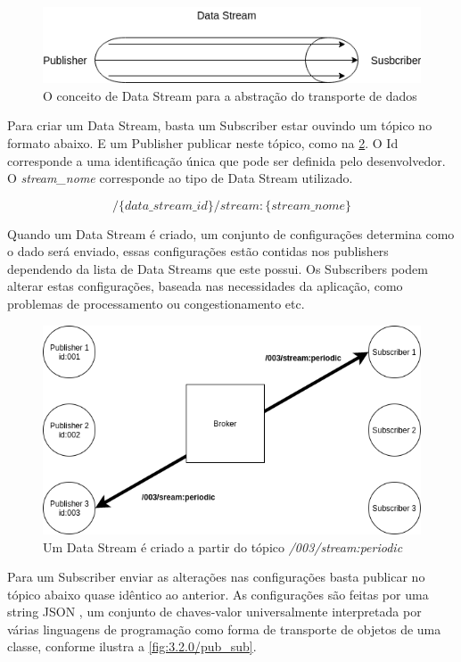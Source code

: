 \begin{figure}[h!]
\centering
\includegraphics[width=13cm]{./02_Capitulos/02_Cap3/figures/data_stream}
\caption{O conceito de Data Stream para a abstração do transporte de dados}
\label{fig:3.1.0/data_stream}
\end{figure}

Para criar um Data Stream, basta um Subscriber estar ouvindo um tópico no formato abaixo. E um Publisher publicar neste tópico, como na \ref{fig:3.1.0/data_stream_creation}. O Id corresponde a uma identificação única que pode ser definida pelo desenvolvedor. O \textit{stream\_nome} corresponde ao tipo de Data Stream utilizado.

$$ /\{data\_stream\_id\}/stream:\{stream\_nome\} $$

Quando um Data Stream é criado, um conjunto de configurações determina como o dado será enviado, essas configurações estão contidas nos publishers dependendo da lista de Data Streams que este possui. Os Subscribers podem alterar estas configurações, baseada nas necessidades da aplicação, como problemas de processamento ou congestionamento etc.

\begin{figure}[h!]
\centering
\includegraphics[width=13cm]{./02_Capitulos/02_Cap3/figures/data_stream_creation}
\caption{Um Data Stream é criado a partir do tópico \textit{/003/stream:periodic}}
\label{fig:3.1.0/data_stream_creation}
\end{figure}


Para um Subscriber enviar as alterações nas configurações basta publicar no tópico abaixo quase idêntico ao anterior. As configurações são feitas por uma string JSON \cite{json}, um conjunto de chaves-valor universalmente interpretada por várias linguagens de programação como forma de transporte de objetos de uma classe, conforme ilustra a \ref{fig:3.2.0/pub_sub}.

